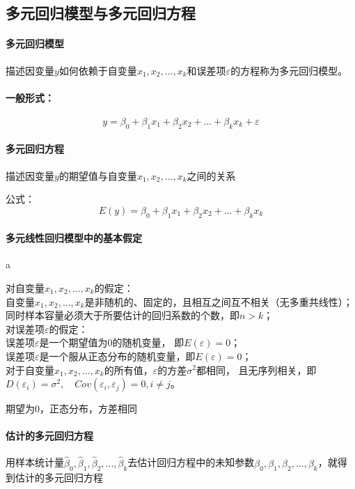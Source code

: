 \documentclass[UTF8,10pt]{book}
\begin{document}
{\subsection{多元回归模型与多元回归方程}
\paragraph{多元回归模型}	描述因变量$y$如何依赖于自变量$x_1,x_2,...,x_k$和误差项$\varepsilon$的方程称为多元回归模型。 

\paragraph{一般形式：}$$y = \beta_0 + \beta_1 x_1 + \beta_2 x_2 + ... + \beta_k x_k + \varepsilon $$

\paragraph{多元回归方程}	描述因变量$y$的期望值与自变量$x_1,x_2,...,x_k$之间的关系 

公式：$$E(y) = \beta_0 + \beta_1 x_1 + \beta_2 x_2 + ... + \beta_k x_k$$

\paragraph{多元线性回归模型中的基本假定}	a

对自变量$x_1,x_2,...,x_k$的假定：\\
自变量$x_1,x_2,...,x_k$是非随机的、固定的，且相互之间互不相关（无多重共线性）；\\
同时样本容量必须大于所要估计的回归系数的个数，即$n>k$； 
\\

对误差项$\varepsilon$的假定：
\\
误差项$\varepsilon$是一个期望值为$0$的随机变量，
即$E(\varepsilon)=0$；
\\
误差项$\varepsilon$是一个服从正态分布的随机变量，即$E(\varepsilon)=0$； 
\\
对于自变量$x_1,x_2,...,x_k$的所有值，$\varepsilon$的方差$\sigma^2$都相同，
且无序列相关，即
$D(\varepsilon_i) = \sigma^2 , \quad Cov(\varepsilon_i,\varepsilon_j)=0,i \neq j$。

期望为0，正态分布，方差相同

\paragraph{估计的多元回归方程}	用样本统计量$ \hat{\beta}_0,\hat{\beta}_1,\hat{\beta}_2,...,\hat{\beta}_k $去估计回归方程中的未知参数$\beta_0,\beta_1,\beta_2,...,\beta_k$，就得到估计的多元回归方程 

}
\end{document}
